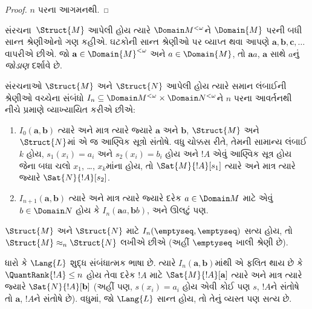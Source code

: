 \begin{proof}
  $n$ પરના આગમનથી.
\end{proof}

\begin{defn}
  સંરચના~$\Struct{M}$ આપેલી હોય ત્યારે $\Domain M^{<\omega}$ને
  $\Domain{M}$ પરની બધી સાન્ત શ્રેણીઓનો ગણ કહીએ. ઘટકોની સાન્ત
  શ્રેણીઓ પર વ્યાપ્ત થવા આપણે $\mathbf{a}, \mathbf{b}, \mathbf{c},
  \ldots$ વાપરીએ છીએ. જો $\mathbf{a} \in \Domain{M}^{<\omega}$ અને
  $a \in \Domain{M}$, તો $\mathbf{a}a$, $\mathbf{a}$ સાથે $a$નું
  \emph{જોડાણ} દર્શાવે છે.
\end{defn}

\begin{defn}
  સંરચનાઓ $\Struct{M}$ અને $\Struct{N}$ આપેલી હોય ત્યારે સમાન
  લંબાઈની શ્રેણીઓ વચ્ચેના સંબંધો $I_n \subseteq \Domain M^{<\omega}
  \times \Domain N^{<\omega}$ને $n$ પરના આવર્તનથી નીચે પ્રમાણે
  વ્યાખ્યાયિત કરીએ છીએ:
   \begin{enumerate}
   \item $I_0(\mathbf{a},\mathbf{b})$ ત્યારે અને માત્ર ત્યારે જ્યારે
     $\mathbf{a}$ અને $\mathbf{b}$, $\Struct{M}$ અને $\Struct{N}$માં
     એ જ આણ્વિક સૂત્રો સંતોષે. વધુ ચોક્કસ રીતે, તેમની સામાન્ય
     લંબાઈ $k$ હોય, $s_1(x_i) = a_i$ અને $s_2(x_i) = b_i$ હોય અને
     $!A$ એવું આણ્વિક સૂત્ર હોય જેના બધા ચલો $x_1$, \dots,
     $x_k$માંના હોય, તો $\Sat{M}{!A}[s_1]$ ત્યારે અને માત્ર ત્યારે જ્યારે
     $\Sat{N}{!A}[s_2]$.
   \item $I_{n+1} (\mathbf{a},\mathbf{b})$ ત્યારે અને માત્ર ત્યારે
     જ્યારે દરેક $a\in \Domain M$ માટે એવું $b\in \Domain N$ હોય કે
     $I_n(\mathbf{a}a,\mathbf{b}b)$, અને ઊલટું પણ.
   \end{enumerate}
\end{defn}


\begin{defn}
  $\Struct{M}$ અને $\Struct{N}$ માટે
  $I_n(\emptyseq,\emptyseq)$ સત્ય હોય, તો $\Struct{M} \approx_n
  \Struct{N}$ લખીએ છીએ (અહીં $\emptyseq$ ખાલી શ્રેણી છે).
\end{defn}

\begin{thm}
  ધારો કે $\Lang{L}$ શુદ્ધ સંબંધાત્મક ભાષા છે. ત્યારે
  $I_n(\mathbf{a},\mathbf{b})$માંથી એ ફલિત થાય છે કે
  $\QuantRank{!A} \le n$ હોય તેવા દરેક $!A$ માટે
  $\Sat{M}{!A}[\mathbf{a}]$ ત્યારે અને માત્ર ત્યારે જ્યારે
  $\Sat{N}{!A}[\mathbf{b}]$ (અહીં પણ, $s(x_i) = a_i$ હોય એવી કોઈ પણ
  $s$, $!A$ને સંતોષે તો $\mathbf{a}$, $!A$ને સંતોષે છે). વધુમાં, જો
  $\Lang{L}$ સાન્ત હોય, તો તેનું વ્યસ્ત પણ સત્ય છે.
\end{thm}

